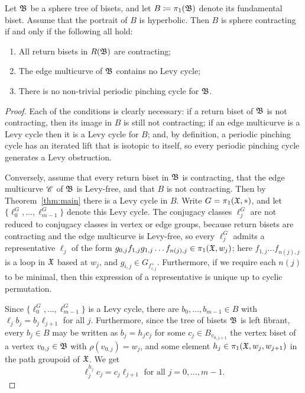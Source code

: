 \documentclass{amsart}
\begin{document}
\begin{thm}\label{thm:algebraic amalgam}
  Let ${\mathfrak B}$ be a sphere tree of bisets, and let
  $B\coloneqq\pi_1({\mathfrak B})$ denote its fundamental biset. Assume that
  the portrait of $B$ is hyperbolic. Then $B$ is sphere contracting if
  and only if the following all hold:
  \begin{enumerate}
  \item All return bisets in $R({\mathfrak B})$ are contracting;
  \item The edge multicurve of ${\mathfrak B}$ contains no Levy cycle;
  \item There is no non-trivial periodic pinching cycle for ${\mathfrak B}$.
  \end{enumerate}
\end{thm}
\begin{proof}
  Each of the conditions is clearly necessary: if a return biset of
  ${\mathfrak B}$ is not contracting, then its image in $B$ is still not
  contracting; if an edge multicurve is a Levy cycle then it is a Levy
  cycle for $B$; and, by definition, a periodic pinching cycle has an
  iterated lift that is isotopic to itself, so every periodic pinching
  cycle generates a Levy obstruction.

  Conversely, assume that every return biset in ${\mathfrak B}$ is contracting,
  that the edge multicurve ${\mathscr C}$ of ${\mathfrak B}$ is Levy-free, and that $B$
  is not contracting. Then by Theorem~\ref{thm:main} there is a Levy
  cycle in $B$. Write $G=\pi_1({\mathfrak X},*)$, and let
  $\{\ell_0^G,\dots,\ell_{m-1}^G\}$ denote this Levy cycle.  The
  conjugacy classes $\ell_j^G$ are not reduced to conjugacy classes in
  vertex or edge groups, because return bisets are contracting and the
  edge multicurve is Levy-free, so every $\ell_j^G$ admits a
  representative $\ell_j$ of the form
  $g_{0,j}f_{1,j} g_{1,j}\dots f_{n(j),j}\in \pi_1({\mathfrak X},w_j)$; here $f_{1,j}\dots f_{n(j),j}$ is a loop in ${\mathfrak X}$ based
  at $w_j$, and $g_{i,j}\in G_{f_{i,j}^+}$. Furthermore, if we require
  each $n(j)$ to be minimal, then this expression of a representative
  is unique up to cyclic permutation.

  Since $\{\ell_0^G,\dots,\ell_{m-1}^G\}$ is a Levy cycle, there are
  $b_0,\dots, b_{m-1}\in B$ with $\ell_j b_j=b_j \ell_{j+1}$ for all
  $j$. Furthermore, since the tree of bisets ${\mathfrak B}$ is left fibrant,
  every $b_j\in B$ may be written as $b_j = h_j c_j$ for some
  $c_j\in B_{v_{0,j+1}}$ the vertex biset of a vertex $v_{0,j}\in{\mathfrak B}$
  with $\rho(v_{0,j})=w_j$, and some element
  $h_j\in\pi_1({\mathfrak X},w_j,w_{j+1})$ in the path groupoid of ${\mathfrak X}$. We get
  \[\ell_j^{h_j} c_j = c_j \ell_{j+1}\text{ for all }j=0,\dots,m-1.\]


\end{proof}
\end{document}

